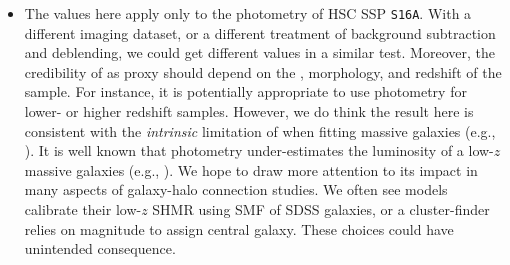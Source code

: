 \documentclass[a4paper,fleqn,usenatbib]{mnras}
\begin{document}
\begin{itemize}
        \item The \sighalo{} values here apply only to the \cmodel{} photometry of HSC SSP
            \texttt{S16A}. With a different imaging dataset, or a different treatment of background
            subtraction and deblending, we could get different \sighalo{} values in a similar test.
            Moreover, the credibility of \mcmodel{} as \mvir{} proxy should depend on the \mstar{},
            morphology, and redshift of the sample. For instance, it is potentially appropriate
            to use \cmodel{} photometry for lower-\mstar{} or higher redshift samples.
            However, we do think the result here is consistent with the \emph{intrinsic}
            limitation of \cmodel{} when fitting massive galaxies (e.g., \addref{}).
            It is well known that \cmodel{} photometry under-estimates the luminosity of a low-$z$
            massive galaxies (e.g., \addref{}).
            We hope to draw more attention to its impact in many aspects of galaxy-halo connection
            studies. We often see models calibrate their low-$z$ SHMR using \cmodel{} SMF of SDSS
            galaxies, or a cluster-finder relies on \cmodel{} magnitude to assign central galaxy.
            These choices could have unintended consequence.

    \end{itemize}
\end{document}
